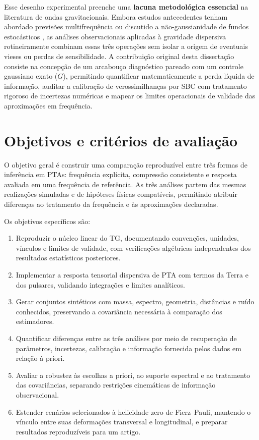 Esse desenho experimental preenche uma \textbf{lacuna metodológica essencial} na
literatura de ondas gravitacionais. Embora estudos antecedentes tenham abordado
previsões multifrequência \autocite{han2026} ou discutido a não-gaussianidade de
fundos estocásticos \autocite{franciolini2025}, as análises observacionais aplicadas
à gravidade dispersiva rotineiramente combinam essas três operações sem isolar a
origem de eventuais vieses ou perdas de sensibilidade. A contribuição original
desta dissertação consiste na concepção de um arcabouço diagnóstico pareado com
um controle gaussiano exato ($G$), permitindo quantificar matematicamente a perda
líquida de informação, auditar a calibração de verossimilhanças por SBC com
tratamento rigoroso de incertezas numéricas e mapear os limites operacionais de
validade das aproximações em frequência.

\section{Objetivos e critérios de avaliação}

O objetivo geral é construir uma comparação reproduzível entre três
formas de inferência em PTAs: frequência explícita, compressão
consistente e resposta avaliada em uma frequência de referência. As
três análises partem das mesmas realizações simuladas e de
hipóteses físicas compatíveis, permitindo atribuir diferenças ao
tratamento da frequência e às aproximações declaradas.

Os objetivos específicos são:
\begin{enumerate}
  \item Reproduzir o núcleo linear do TG, documentando convenções,
  unidades, vínculos e limites de validade, com verificações algébricas
  independentes dos resultados estatísticos posteriores.
  \item Implementar a resposta tensorial dispersiva de PTA com termos
  da Terra e dos pulsares, validando integrações e limites analíticos.
  \item Gerar conjuntos sintéticos com massa, espectro, geometria,
  distâncias e ruído conhecidos, preservando a covariância necessária à
  comparação dos estimadores.
  \item Quantificar diferenças entre as três análises por meio de
  recuperação de parâmetros, incertezas, calibração e informação
  fornecida pelos dados em relação à priori.
  \item Avaliar a robustez às escolhas a priori, ao suporte espectral e
  ao tratamento das covariâncias, separando restrições cinemáticas de
  informação observacional.
  \item Estender cenários selecionados à helicidade zero de
  Fierz--Pauli, mantendo o vínculo entre suas deformações transversal e
  longitudinal, e preparar resultados reproduzíveis para um artigo.
\end{enumerate}


